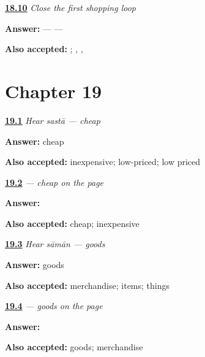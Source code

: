 \noindent\begin{minipage}[t]{\linewidth}
\raggedright
\hyperlink{review-MW-R13-shopping-close-recall}{\textbf{18.10}} \emph{Close the first shopping loop}\par
\small \textbf{Answer:}  —  — \par
\footnotesize \textbf{Also accepted:}   ; , , 
\end{minipage}\par\medskip

\section*{Chapter 19}

\noindent\begin{minipage}[t]{\linewidth}
\raggedright
\hyperlink{review-MW-C14-hear-sasta-meaning}{\textbf{19.1}} \emph{Hear \emph{sastā} — cheap}\par
\small \textbf{Answer:} cheap\par
\footnotesize \textbf{Also accepted:} inexpensive; low-priced; low priced
\end{minipage}\par\medskip

\noindent\begin{minipage}[t]{\linewidth}
\raggedright
\hyperlink{review-MW-C14-sasta-dictation}{\textbf{19.2}} \emph{ — cheap on the page}\par
\small \textbf{Answer:} \par
\footnotesize \textbf{Also accepted:}  cheap;  inexpensive
\end{minipage}\par\medskip

\noindent\begin{minipage}[t]{\linewidth}
\raggedright
\hyperlink{review-MW-C14-hear-samaan-meaning}{\textbf{19.3}} \emph{Hear \emph{sāmān} — goods}\par
\small \textbf{Answer:} goods\par
\footnotesize \textbf{Also accepted:} merchandise; items; things
\end{minipage}\par\medskip

\noindent\begin{minipage}[t]{\linewidth}
\raggedright
\hyperlink{review-MW-C14-samaan-dictation}{\textbf{19.4}} \emph{ — goods on the page}\par
\small \textbf{Answer:} \par
\footnotesize \textbf{Also accepted:}  goods;  merchandise
\end{minipage}\par\medskip

